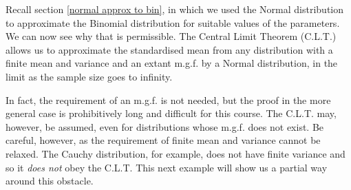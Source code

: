 \documentclass[12pt,a4paper]{article}
\begin{document}
Recall section \ref{normal approx to bin}, in which we used the Normal distribution to approximate the Binomial distribution for suitable values of the parameters. We can now see why that is permissible. The Central Limit Theorem (C.L.T.) allows us to approximate the standardised mean from any distribution with a finite mean and variance and an extant m.g.f. by a Normal distribution, in the limit as the sample size goes to infinity.

In fact, the requirement of an m.g.f. is not needed, but the proof in the more general case is prohibitively long and difficult for this course. The C.L.T. may, however, be assumed, even for distributions whose m.g.f. does not exist. Be careful, however, as the requirement of finite mean and variance cannot be relaxed. The Cauchy distribution, for example, does not have finite variance and so it \emph{does not} obey the C.L.T. This next example will show us a partial way around this obstacle.
\end{document}
